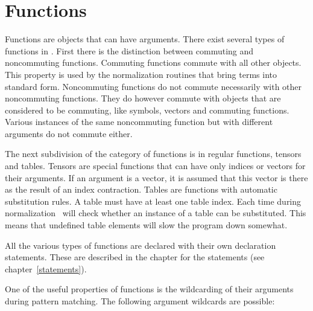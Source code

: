 
\chapter{Functions}
\label{functions}

\noindent Functions are objects that can have arguments. 
There exist several types of functions in \FORM. First there is the 
distinction between commuting and 
noncommuting functions. Commuting functions commute 
with all other objects. This property is used by the normalization routines 
that bring terms into standard form. Noncommuting functions do not commute 
necessarily with other noncommuting functions. They do however commute with 
objects that are considered to be commuting, like symbols, vectors and 
commuting functions. Various instances of the same noncommuting function 
but with different arguments do not commute either.

\noindent The next subdivision of the category of functions is in regular 
functions, tensors and 
tables. Tensors are special functions that can have only 
indices or vectors for their arguments. If an argument is a vector, it is 
assumed that this vector is there as the result of an index contraction. 
Tables are functions with automatic substitution rules. A table must have 
at least one table index. Each time 
during normalization \FORM\ will check whether an instance of a table can be 
substituted. This means that undefined table elements will slow the program 
down somewhat.

\noindent All the various types of functions are declared with their own 
declaration statements. These are described in the chapter for the 
statements (see chapter~\ref{statements}).

One of the useful properties of functions is the 
wildcarding of their arguments during pattern matching. The 
following argument wildcards are possible:



